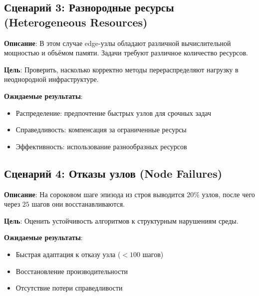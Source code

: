 \subsection{Сценарий 3: Разнородные ресурсы (Heterogeneous Resources)}

\textbf{Описание}: В этом случае edge-узлы обладают различной вычислительной мощностью и объёмом памяти. Задачи требуют различное количество ресурсов. 

\textbf{Цель}: Проверить, насколько корректно методы перераспределяют нагрузку в неоднородной инфраструктуре.

\textbf{Ожидаемые результаты}:
\begin{itemize}
	\item Распределение: предпочтение быстрых узлов для срочных задач
	\item Справедливость: компенсация за ограниченные ресурсы
	\item Эффективность: использование разнообразных ресурсов
\end{itemize}

\subsection{Сценарий 4: Отказы узлов (Node Failures)}

\textbf{Описание}: На сороковом шаге эпизода из строя выводится $20\%$ узлов, после чего через $25$ шагов они восстанавливаются.

\textbf{Цель}: Оценить устойчивость алгоритмов к структурным нарушениям среды.

\textbf{Ожидаемые результаты}:
\begin{itemize}
	\item Быстрая адаптация к отказу узла ($< 100$ шагов)
	\item Восстановление производительности
	\item Отсутствие потери справедливости
\end{itemize}

